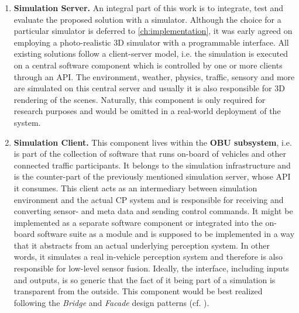 \begin{enumerate}[C1: ]
	\item \textbf{Simulation Server.} An integral part of this work is to integrate, test and evaluate the proposed solution with a simulator. Although the choice for a particular simulator is deferred to \cref{ch:implementation}, it was early agreed on employing a photo-realistic 3D simulator with a programmable interface. All existing solutions follow a client-server model, i.e. the simulation is executed on a central software component which is controlled by one or more clients through an API. The environment, weather, physics, traffic, sensory and more are simulated on this central server and usually it is also responsible for 3D rendering of the  scenes. Naturally, this component is only required for research purposes and would be omitted in a real-world deployment of the system.
	\item \textbf{Simulation Client.} This component lives within the \textbf{OBU subsystem}, i.e. is part of the collection of software that runs on-board of vehicles and other connected traffic participants. It belongs to the simulation infrastructure and is the counter-part of the previously mentioned simulation server, whose API it consumes. This client acts as an intermediary between simulation environment and the actual CP system and is responsible for receiving and converting sensor- and meta data and sending control commands. It might be implemented as a separate software component or integrated into the on-board software suite as a module and is supposed to be implemented in a way that it abstracts from an actual underlying perception system. In other words, it simulates a real in-vehicle perception system and therefore is also responsible for low-level sensor fusion. Ideally, the interface, including inputs and outputs, is so generic that the fact of it being part of a simulation is transparent from the outside. This component would be best realized following the \textit{Bridge} and \textit{Facade} design patterns (cf. \cite{EricFreemanElisabethFreemanBertBates2013}).

\end{enumerate}
